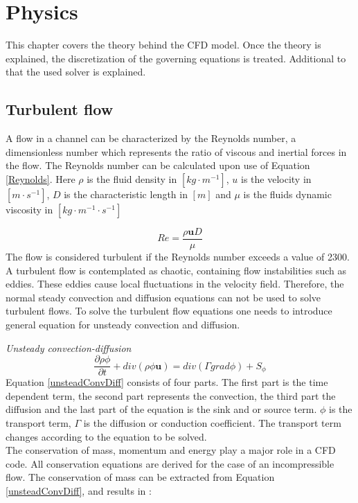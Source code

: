 \documentclass{CFD2017}
\begin{document}
\section{Physics}
This chapter covers the theory behind the CFD model. Once the theory is explained, the discretization of the governing equations is treated. Additional to that the used solver is explained.

\subsection{Turbulent flow}
A flow in a channel can be characterized by the Reynolds number, a dimensionless number which represents the ratio of viscous and inertial forces in the flow. The Reynolds number can be calculated upon use of Equation \ref{Reynolds}\cite{Versteeg2007}. Here $\rho$ is the fluid density in $[kg\cdot m^{-1}]$, $u$ is the velocity in $[m\cdot s^{-1}]$, $D$ is the characteristic length in $[m]$ and $\mu$ is the fluids dynamic viscosity in $[kg\cdot m^{-1}\cdot s^{-1}]$

\begin{equation}
\label{Reynolds}
Re = \frac{\rho \boldsymbol{u} D}{\mu}
\end{equation}
The flow is considered turbulent if the Reynolds number exceeds a value of 2300. A turbulent flow is contemplated as chaotic, containing flow instabilities such as eddies. These eddies cause local fluctuations in the velocity field. Therefore, the normal steady convection and diffusion equations can not be used to solve turbulent flows. To solve the turbulent flow equations one needs to introduce general equation for unsteady convection and diffusion\cite{Versteeg2007}.\vspace{2mm}

\emph{Unsteady convection-diffusion}
\begin{equation}
\label{unsteadConvDiff}
\frac{\partial \rho \phi}{\partial t} + div(\rho\phi\mathbf u)= div(\Gamma grad \phi)+S_{\phi}
\end{equation}
Equation \ref{unsteadConvDiff} consists of four parts. The first part is the time dependent term, the second part represents the convection, the third part the diffusion and the last part of the equation is the sink and or source term. $\phi$ is the transport term, $\Gamma$ is the diffusion or conduction coefficient. The transport term changes according to the equation to be solved. \\
The conservation of mass, momentum and energy play a major role in a CFD code. All conservation equations are derived for the case of an incompressible flow. The conservation of mass can be extracted from Equation \ref{unsteadConvDiff}, and results in \cite{slides}:\vspace{2mm}
\end{document}
